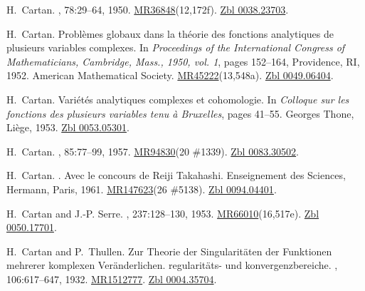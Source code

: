 \documentclass[11pt,a4paper, final, twoside]{article}
\numberwithin{equation}{section}
\begin{document}
\begin{appendices}
\begin{thebibliography}{100}
H.~Cartan.
,
  78:29--64, 1950.
\newblock
  \href{http://www.ams.org/mathscinet-getitem?mr=36848}{MR36848}(12,172f).
  \href{http://zbmath.org/?q=an:0038.23703}{Zbl 0038.23703}.

H.~Cartan.
\newblock Probl\`emes globaux dans la th\'eorie des fonctions analytiques de
  plusieurs variables complexes.
\newblock In {\em Proceedings of the {I}nternational {C}ongress of
  {M}athematicians, {C}ambridge, {M}ass., 1950, vol. 1}, pages 152--164,
  Providence, RI, 1952. American Mathematical Society.
\newblock
  \href{http://www.ams.org/mathscinet-getitem?mr=45222}{MR45222}(13,548a).
  \href{http://zbmath.org/?q=an:0049.06404}{Zbl 0049.06404}.

H.~Cartan.
\newblock Vari\'et\'es analytiques complexes et cohomologie.
\newblock In {\em Colloque sur les fonctions des plusieurs variables tenu {\`a}
  Bruxelles}, pages 41--55. Georges Thone, Li\`ege, 1953.
\newblock \href{http://zbmath.org/?q=an:0053.05301}{Zbl 0053.05301}.

H.~Cartan.
,
  85:77--99, 1957.
\newblock \href{http://www.ams.org/mathscinet-getitem?mr=94830}{MR94830}(20
  \#1339). \href{http://zbmath.org/?q=an:0083.30502}{Zbl 0083.30502}.

H.~Cartan.
.
\newblock Avec le concours de Reiji Takahashi. Enseignement des Sciences,
  Hermann, Paris, 1961.
\newblock \href{http://www.ams.org/mathscinet-getitem?mr=147623}{MR147623}(26
  \#5138). \href{http://zbmath.org/?q=an:0094.04401}{Zbl 0094.04401}.

H.~Cartan and J.-P. Serre.
, 237:128--130, 1953.
\newblock
  \href{http://www.ams.org/mathscinet-getitem?mr=66010}{MR66010}(16,517e).
  \href{http://zbmath.org/?q=an:0050.17701}{Zbl 0050.17701}.

H.~Cartan and P.~Thullen.
\newblock Zur {T}heorie der {S}ingularit\"aten der {F}unktionen mehrerer
  komplexen {V}er\"anderlichen. regularit\"ats- und konvergenzbereiche.
, 106:617--647, 1932.
\newblock \href{http://www.ams.org/mathscinet-getitem?mr=1512777}{MR1512777}.
  \href{http://zbmath.org/?q=an:0004.35704}{Zbl 0004.35704}.


\end{thebibliography}
\end{appendices}
\end{document}
